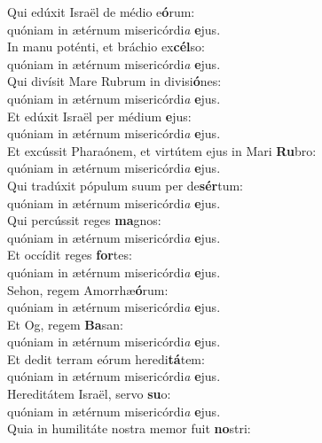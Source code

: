 \evenverse Qui edúxit Israël de médio e\textbf{ó}rum:~\*\\
\evenverse quóniam in ætérnum misericórdi\textit{a} \textbf{e}jus.\\
\oddverse In manu poténti, et bráchio ex\textbf{cél}so:~\*\\
\oddverse quóniam in ætérnum misericórdi\textit{a} \textbf{e}jus.\\
\evenverse Qui divísit Mare Rubrum in divisi\textbf{ó}nes:~\*\\
\evenverse quóniam in ætérnum misericórdi\textit{a} \textbf{e}jus.\\
\oddverse Et edúxit Israël per médium \textbf{e}jus:~\*\\
\oddverse quóniam in ætérnum misericórdi\textit{a} \textbf{e}jus.\\
\evenverse Et excússit Pharaónem, et virtútem ejus in Mari \textbf{Ru}bro:~\*\\
\evenverse quóniam in ætérnum misericórdi\textit{a} \textbf{e}jus.\\
\oddverse Qui tradúxit pópulum suum per de\textbf{sér}tum:~\*\\
\oddverse quóniam in ætérnum misericórdi\textit{a} \textbf{e}jus.\\
\evenverse Qui percússit reges \textbf{ma}gnos:~\*\\
\evenverse quóniam in ætérnum misericórdi\textit{a} \textbf{e}jus.\\
\oddverse Et occídit reges \textbf{for}tes:~\*\\
\oddverse quóniam in ætérnum misericórdi\textit{a} \textbf{e}jus.\\
\evenverse Sehon, regem Amorrhæ\textbf{ó}rum:~\*\\
\evenverse quóniam in ætérnum misericórdi\textit{a} \textbf{e}jus.\\
\oddverse Et Og, regem \textbf{Ba}san:~\*\\
\oddverse quóniam in ætérnum misericórdi\textit{a} \textbf{e}jus.\\
\evenverse Et dedit terram eórum heredi\textbf{tá}tem:~\*\\
\evenverse quóniam in ætérnum misericórdi\textit{a} \textbf{e}jus.\\
\oddverse Hereditátem Israël, servo \textbf{su}o:~\*\\
\oddverse quóniam in ætérnum misericórdi\textit{a} \textbf{e}jus.\\
\evenverse Quia in humilitáte nostra memor fuit \textbf{no}stri:~\*\\

